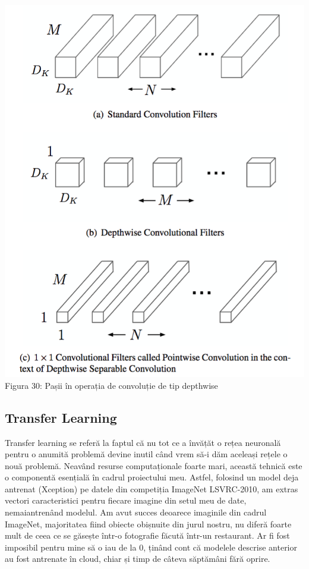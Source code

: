 \begin{center}
\includegraphics[scale=0.4]{depthconv} \\
Figura 30: Pașii în operația de convoluție de tip depthwise
\end{center}

\subsection{Transfer Learning}
Transfer learning se referă la faptul că nu tot ce a învățăt o rețea neuronală pentru o anumită problemă devine inutil când vrem să-i dăm aceleași rețele o nouă problemă. Neavând resurse computaționale foarte mari, această tehnică este o componentă esențială în cadrul proiectului meu. Astfel, folosind un model deja antrenat (Xception) pe datele din competiția ImageNet LSVRC-2010, am extras vectori caracteristici pentru fiecare imagine din setul meu de date, nemaiantrenând modelul. Am avut succes deoarece imaginile din cadrul ImageNet, majoritatea fiind obiecte obișnuite din jurul nostru, nu diferă foarte mult de ceea ce se găsește într-o fotografie făcută într-un restaurant. Ar fi fost imposibil pentru mine să o iau de la 0, ținând cont că modelele descrise anterior au fost antrenate în cloud, chiar și timp de câteva săptămâni fără oprire.